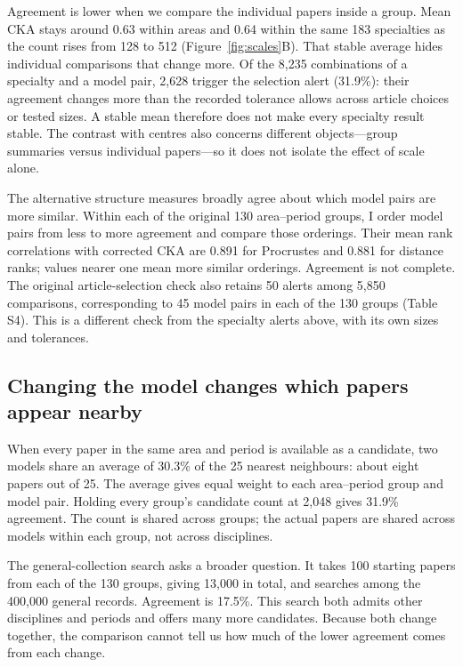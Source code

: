 \documentclass[12pt]{article}
\begin{document}
Agreement is lower when we compare the individual papers inside a group. Mean CKA stays around 0.63 within areas and 0.64 within the same 183 specialties as the count rises from 128 to 512 (Figure~\ref{fig:scales}B). That stable average hides individual comparisons that change more. Of the 8,235 combinations of a specialty and a model pair, 2,628 trigger the selection alert (31.9\%): their agreement changes more than the recorded tolerance allows across article choices or tested sizes. A stable mean therefore does not make every specialty result stable. The contrast with centres also concerns different objects---group summaries versus individual papers---so it does not isolate the effect of scale alone.

The alternative structure measures broadly agree about which model pairs are more similar. Within each of the original 130 area--period groups, I order model pairs from less to more agreement and compare those orderings. Their mean rank correlations with corrected CKA are 0.891 for Procrustes and 0.881 for distance ranks; values nearer one mean more similar orderings. Agreement is not complete. The original article-selection check also retains 50 alerts among 5,850 comparisons, corresponding to 45 model pairs in each of the 130 groups (Table S4). This is a different check from the specialty alerts above, with its own sizes and tolerances.

\FloatBarrier
\subsection{Changing the model changes which papers appear nearby}
When every paper in the same area and period is available as a candidate, two models share an average of 30.3\% of the 25 nearest neighbours: about eight papers out of 25. The average gives equal weight to each area--period group and model pair. Holding every group's candidate count at 2,048 gives 31.9\% agreement. The count is shared across groups; the actual papers are shared across models within each group, not across disciplines.

The general-collection search asks a broader question. It takes 100 starting papers from each of the 130 groups, giving 13,000 in total, and searches among the 400,000 general records. Agreement is 17.5\%. This search both admits other disciplines and periods and offers many more candidates. Because both change together, the comparison cannot tell us how much of the lower agreement comes from each change.
\end{document}
